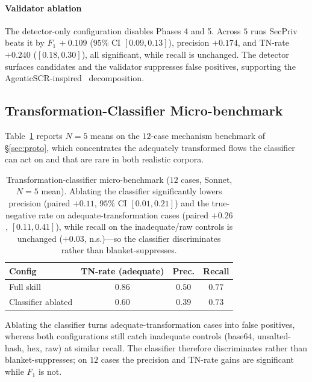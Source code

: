 \documentclass[runningheads]{llncs}
\begin{document}
\paragraph{Validator ablation} The detector-only configuration disables Phases 4 and 5. Across $5$ runs SecPriv beats it by $F_1\,+0.109$ ($95\%$ CI $[0.09,0.13]$), precision $+0.174$, and TN-rate $+0.240$ ($[0.18,0.30]$), all significant, while recall is unchanged. The detector surfaces candidates and the validator suppresses false positives, supporting the AgenticSCR-inspired~\cite{charoenwet2026agenticscr} decomposition.

\subsection{Transformation-Classifier Micro-benchmark}\label{sec:microbench}

Table~\ref{tab:micro} reports $N{=}5$ means on the $12$-case mechanism benchmark of \S\ref{sec:proto}, which concentrates the adequately transformed flows the classifier can act on and that are rare in both realistic corpora.

\begin{table}[htbp]
\centering
\footnotesize
\setlength{\tabcolsep}{4pt}
\begin{tabular}{lccc}
\toprule
\textbf{Config} & \textbf{TN-rate (adequate)} & \textbf{Prec.} & \textbf{Recall} \\
\midrule
Full skill          & $\mathbf{0.86}$ & $\mathbf{0.50}$ & $0.77$ \\
Classifier ablated  & $0.60$          & $0.39$          & $0.73$ \\
\bottomrule
\end{tabular}
\caption{Transformation-classifier micro-benchmark ($12$ cases, Sonnet, $N{=}5$ mean). Ablating the classifier significantly lowers precision (paired $+0.11$, $95\%$ CI $[0.01,0.21]$) and the true-negative rate on adequate-transformation cases (paired $+0.26$, $[0.11,0.41]$), while recall on the inadequate/raw controls is unchanged ($+0.03$, n.s.)---so the classifier discriminates rather than blanket-suppresses.}
\label{tab:micro}
\end{table}

Ablating the classifier turns adequate-transformation cases into false positives, whereas both configurations still catch inadequate controls (base64, unsalted-hash, hex, raw) at similar recall. The classifier therefore discriminates rather than blanket-suppresses; on $12$ cases the precision and TN-rate gains are significant while $F_1$ is not.
\end{document}
